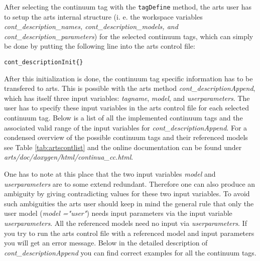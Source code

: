 {After selecting the continuum tag with the {\tt tagDefine} method, 
the arts user has to setup the arts internal structure (i. e. the workspace 
variables {\it cont\_description\_names, cont\_description\_models, 
and cont\_description\_parameters}) for the selected continuum tags, 
which can simply be done by putting the following line into the 
arts control file:
\begin{verbatim}
cont_descriptionInit{}
\end{verbatim}

After this initialization is done, the continuum tag specific
information has to be transfered to arts. This is possible with the 
arts method {\it cont\_descriptionAppend}, which has itself 
three input variables: {\it tagname}, {\it model}, and 
{\it userparameters}. The user has to specify these input 
variables in the arts control file for each selected continuum tag. 
Below is a list of all the implemented continuum tags and the associated
valid range of the input variables for {\it cont\_descriptionAppend}. 
For a condensed overview of the possible continuum tags and their 
referenced models see Table \ref{tab:artscontlist} and the 
online documentation can be found under {\it arts/doc/doxygen/html/continua\_cc.html}.

One has to note at this place that the two input variables {\it model} and
{\it userparameters} are to some extend redundant. Therefore one can also 
produce an ambiguity by giving contradicting values for these two input variables.
To avoid such ambiguities the arts user should keep in mind the general 
rule that only the user model ({\it model ="user"}) needs input parameters 
via the input variable {\it userparameters}. All the referenced models 
need no input via {\it userparameters}. If you try to run the arts control 
file with a referenced model and input parameters you will get an error message.
Below in the detailed description of {\it cont\_descriptionAppend} you 
can find correct examples for all the continuum tags.
 
}
